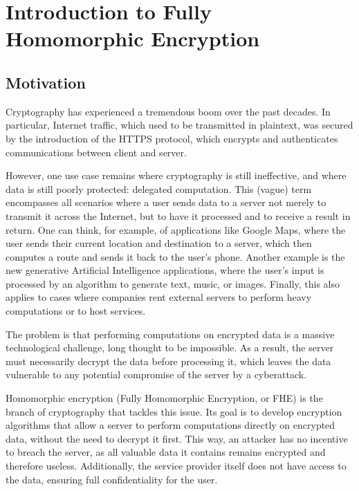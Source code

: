
\chapter{Introduction to Fully Homomorphic Encryption}
\label{chap:fhe}


\section{Motivation}

Cryptography has experienced a tremendous boom over the past decades. In particular, Internet traffic, which used to be transmitted in plaintext, was secured by the introduction of the HTTPS protocol, which encrypts and authenticates communications between client and server.

However, one use case remains where cryptography is still ineffective, and where data is still poorly protected: delegated computation. This (vague) term encompasses all scenarios where a user sends data to a server not merely to transmit it across the Internet, but to have it processed and to receive a result in return. One can think, for example, of applications like Google Maps, where the user sends their current location and destination to a server, which then computes a route and sends it back to the user’s phone. Another example is the new generative Artificial Intelligence applications, where the user’s input is processed by an algorithm to generate text, music, or images. Finally, this also applies to cases where companies rent external servers to perform heavy computations or to host services.

The problem is that performing computations on encrypted data is a massive technological challenge, long thought to be impossible. As a result, the server must necessarily decrypt the data before processing it, which leaves the data vulnerable to any potential compromise of the server by a cyberattack.


Homomorphic encryption (Fully Homomorphic Encryption, or \gls{FHE}) is the branch of cryptography that tackles this issue. Its goal is to develop encryption algorithms that allow a server to perform computations directly on encrypted data, without the need to decrypt it first. This way, an attacker has no incentive to breach the server, as all valuable data it contains remains encrypted and therefore useless. Additionally, the service provider itself does not have access to the data, ensuring full confidentiality for the user.



